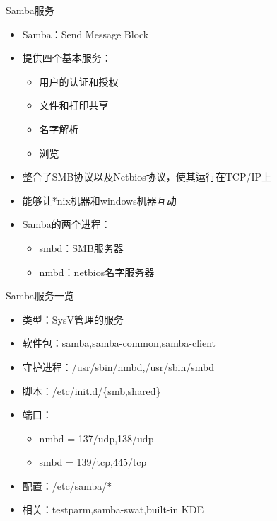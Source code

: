 \begin{frame}{Samba服务}
\begin{itemize}
\item Samba：Send Message Block
\item 提供四个基本服务：

\begin{itemize}
\item 用户的认证和授权
\item 文件和打印共享
\item 名字解析
\item 浏览
\end{itemize}
\item 整合了SMB协议以及Netbios协议，使其运行在TCP/IP上
\item 能够让{*}nix机器和windows机器互动
\item Samba的两个进程：

\begin{itemize}
\item smbd：SMB服务器
\item nmbd：netbios名字服务器
\end{itemize}
\end{itemize}

\end{frame} 
\begin{frame}{Samba服务一览}
\begin{itemize}
\item 类型：SysV管理的服务
\item 软件包：samba,samba-common,samba-client
\item 守护进程：/usr/sbin/nmbd,/usr/sbin/smbd
\item 脚本：/etc/init.d/\{smb,shared\} 
\item 端口：

\begin{itemize}
\item nmbd = 137/udp,138/udp
\item smbd = 139/tcp,445/tcp
\end{itemize}
\item 配置：/etc/samba/{*}
\item 相关：testparm,samba-swat,built-in KDE 
\end{itemize}

\end{frame} 
